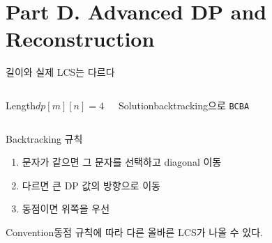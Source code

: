 \section{Part D. Advanced DP and Reconstruction}
\begin{frame}{길이와 실제 LCS는 다르다}
\begin{columns}[T]\begin{block}{Length}$dp[m][n]=4$\end{block}
\begin{block}{Solution}backtracking으로 \texttt{BCBA}\end{block}\end{columns}
\end{frame}
\begin{frame}{Backtracking 규칙}
\begin{enumerate}\item 문자가 같으면 그 문자를 선택하고 diagonal 이동\item 다르면 큰 DP 값의 방향으로 이동\item 동점이면 위쪽을 우선\end{enumerate}
\begin{alertblock}{Convention}동점 규칙에 따라 다른 올바른 LCS가 나올 수 있다.\end{alertblock}
\end{frame}
